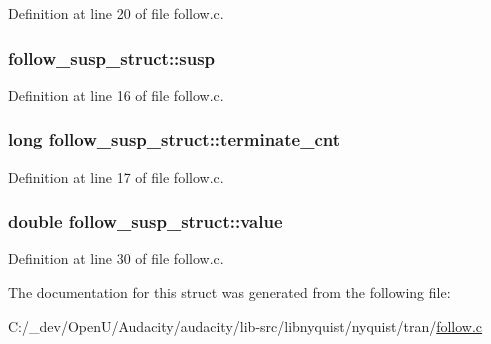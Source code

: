 Definition at line 20 of file follow.\+c.

\subsubsection[{\texorpdfstring{susp}{susp}}]{ follow\+\_\+susp\+\_\+struct\+::susp}\hypertarget{structfollow__susp__struct_ac51c0fb5911928ba83ecb7097f8e0eee}{}\label{structfollow__susp__struct_ac51c0fb5911928ba83ecb7097f8e0eee}


Definition at line 16 of file follow.\+c.

\subsubsection[{\texorpdfstring{terminate\+\_\+cnt}{terminate_cnt}}]{\setlength{\rightskip}{0pt plus 5cm}long follow\+\_\+susp\+\_\+struct\+::terminate\+\_\+cnt}\hypertarget{structfollow__susp__struct_a77ca1631afba1cb5d86280656b045410}{}\label{structfollow__susp__struct_a77ca1631afba1cb5d86280656b045410}


Definition at line 17 of file follow.\+c.

\subsubsection[{\texorpdfstring{value}{value}}]{\setlength{\rightskip}{0pt plus 5cm}double follow\+\_\+susp\+\_\+struct\+::value}\hypertarget{structfollow__susp__struct_a632581f65114e7a2f6df5c9a588784e2}{}\label{structfollow__susp__struct_a632581f65114e7a2f6df5c9a588784e2}


Definition at line 30 of file follow.\+c.



The documentation for this struct was generated from the following file\+:\begin{DoxyCompactItemize}
\item 
C\+:/\+\_\+dev/\+Open\+U/\+Audacity/audacity/lib-\/src/libnyquist/nyquist/tran/\hyperlink{follow_8c}{follow.\+c}\end{DoxyCompactItemize}
